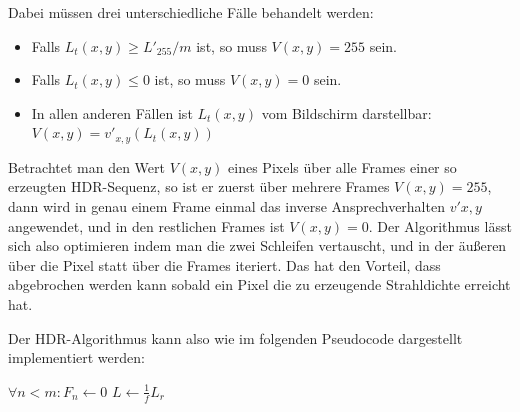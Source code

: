     Dabei müssen drei unterschiedliche Fälle behandelt werden:
    \begin{itemize}
       \item{ Falls  $L_t(x,y) \geq L'_{255}/m$ ist, so muss  $V(x,y)=255$  sein.}
       \item{ Falls  $L_t(x,y) \leq 0$ ist, so muss  $V(x,y)=0$  sein.}
       \item{ In allen anderen Fällen ist $L_t(x,y)$ vom Bildschirm darstellbar:  $V(x,y)=v'_{x,y}(L_t(x,y))$}
    \end{itemize}
  
  
    Betrachtet man den Wert $V(x,y)$ eines Pixels über alle Frames einer so erzeugten HDR-Sequenz, so ist er zuerst über mehrere Frames $V(x,y)=255$, dann wird in genau einem Frame einmal das inverse Ansprechverhalten $v'{x,y}$ angewendet, und in den restlichen  Frames ist $V(x,y)=0$.
    Der Algorithmus lässt sich also optimieren indem man die zwei Schleifen vertauscht, und in der äußeren über die Pixel statt über die Frames iteriert.
    Das hat den Vorteil, dass abgebrochen werden kann sobald ein Pixel die zu erzeugende Strahldichte erreicht hat.
    
    Der HDR-Algorithmus kann also wie im folgenden Pseudocode dargestellt implementiert werden:

   \vspace{3mm}

    \begin{algorithmic} 
      \State $ \forall n<m: F_n \gets 0$                        
      \State $ L \gets \frac{1}{f}L_{r}$                        
          	        
                 	                 
                  
                 
                \Else                                            {} 
                                                 
                \EndIf
             \EndFor  
          \EndFor
    \end{algorithmic} 

